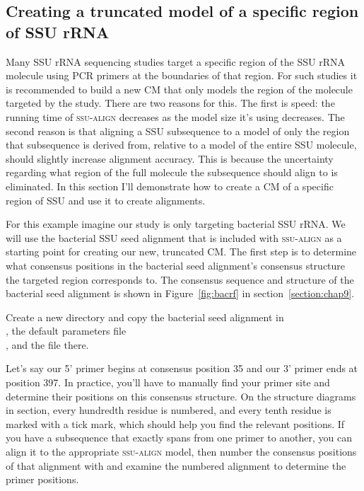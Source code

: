 \subsection{Creating a truncated model of a specific region of SSU rRNA}

Many SSU rRNA sequencing studies target a specific region of the SSU
rRNA molecule using PCR primers at the boundaries of that region. For
such studies it is recommended to build a new CM that only models the
region of the molecule targeted by the study. There are two reasons
for this. The first is speed: the running time of \textsc{ssu-align}
decreases as the model size it's using decreases. The second reason is
that aligning a SSU subsequence to a model of only the region that
subsequence is derived from, relative to a model of the entire SSU
molecule, should slightly increase alignment accuracy. This is because
the uncertainty regarding what region of the full molecule the subsequence
should align to is eliminated. In this section I'll demonstrate how to
create a CM of a specific region of SSU and use it to create
alignments. 

For this example imagine our study is only targeting bacterial SSU
rRNA. We will use the bacterial SSU seed alignment that is included
with \textsc{ssu-align} as a starting point for creating our new,
truncated CM. The first step is to determine what consensus positions
in the bacterial seed alignment's consensus structure the targeted
region corresponds to. The consensus sequence and structure of the
bacterial seed alignment is shown in Figure~\ref{fig:bacrf} in
section~\ref{section:chap9}.


Create a new directory and copy the bacterial seed alignment in \\
, the default parameters
file \\ , and the file
 there.

Let's say our 5' primer begins at consensus position 35 and our 3'
primer ends at position 397.  In practice, you'll have to manually
find your primer site and determine their positions on this consensus
structure. On the structure diagrams in section, every
hundredth residue is numbered, and every tenth residue is marked with
a tick mark, which should help you find the relevant positions.  If
you have a subsequence that exactly spans from one primer to another,
you can align it to the appropriate \textsc{ssu-align} model, then
number the consensus positions of that alignment with
 and examine the numbered alignment to
determine the primer positions.

